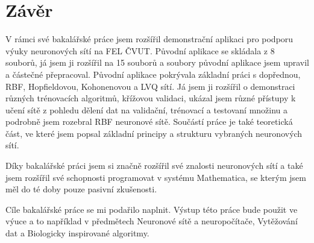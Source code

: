 \documentclass[11pt,twoside,a4paper]{book}
\begin{document}
\chapter{Závěr}
V rámci své bakalářské práce jsem rozšířil demonstrační aplikaci pro podporu výuky neuronových sítí na FEL ČVUT. Původní aplikace se skládala z 8 souborů, já jsem ji rozšířil na 15 souborů a soubory původní aplikace jsem upravil a částečné přepracoval. Původní aplikace pokrývala základní práci s dopřednou, RBF, Hopfieldovou, Kohonenovou a LVQ sítí. Já jsem ji rozšířil o demonstraci různých trénovacích algoritmů, křížovou validaci, ukázal jsem různé přístupy k učení sítě z pohledu dělení dat na validační, trénovací a testovaní množinu a podrobně jsem rozebral  RBF neuronové sítě. Součástí práce je také teoretická část, ve které jsem popsal základní principy a strukturu vybraných neuronových sítí.

Díky bakalářské práci jsem si značně rozšířil své znalosti neuronových sítí a také jsem rozšířil své schopnosti programovat v systému Mathematica, se kterým jsem měl do té doby pouze pasivní zkušenosti.

Cíle bakalářské práce se mi podařilo naplnit. Výstup této práce bude použit ve výuce a to například v předmětech Neuronové sítě a neuropočítače, Vytěžování dat a Biologicky inspirované algoritmy.

%




%
{
\def\CS{$\cal C\kern-0.1667em\lower.5ex\hbox{$\cal S$}\kern-0.075em $}

}

%
\end{document}
